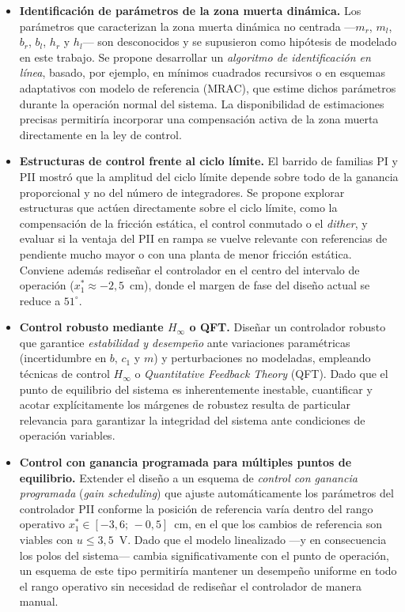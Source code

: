 \begin{itemize}
    \item \textbf{Identificación de parámetros de la zona muerta dinámica.}
    Los parámetros que caracterizan la zona muerta dinámica no centrada ---$m_r$, $m_l$,
    $b_r$, $b_l$, $h_r$ y $h_l$--- son desconocidos y se supusieron como hipótesis de
    modelado en este trabajo. Se propone desarrollar un \emph{algoritmo de identificación
    en línea}, basado, por ejemplo, en mínimos cuadrados recursivos o en esquemas
    adaptativos con modelo de referencia (MRAC), que estime dichos parámetros durante la operación normal del
    sistema. La disponibilidad de estimaciones precisas permitiría incorporar una
    compensación activa de la zona muerta directamente en la ley de control.

    \item \textbf{Estructuras de control frente al ciclo límite.}
    El barrido de familias PI y PII mostró que la amplitud del ciclo límite depende sobre todo
    de la ganancia proporcional y no del número de integradores. Se propone explorar
    estructuras que actúen directamente sobre el ciclo límite, como la compensación de la
    fricción estática, el control conmutado o el \textit{dither}, y evaluar si la ventaja del PII
    en rampa se vuelve relevante con referencias de pendiente mucho mayor o con una planta de
    menor fricción estática. Conviene además rediseñar el controlador en el centro del
    intervalo de operación ($x_1^*\approx-2{,}5$~cm), donde el margen de fase del diseño actual
    se reduce a $51^\circ$.

    \item \textbf{Control robusto mediante $H_\infty$ o QFT.}
    Diseñar un controlador robusto que garantice \emph{estabilidad y desempeño} ante
    variaciones paramétricas (incertidumbre en $b$, $c_1$ y $m$) y perturbaciones no
    modeladas, empleando técnicas de control $H_\infty$ o \textit{Quantitative Feedback
    Theory} (QFT). Dado que el punto de equilibrio del sistema es inherentemente inestable,
    cuantificar y acotar explícitamente los márgenes de robustez resulta de particular
    relevancia para garantizar la integridad del sistema ante condiciones de operación
    variables.

    \item \textbf{Control con ganancia programada para múltiples puntos de equilibrio.}
    Extender el diseño a un esquema de \emph{control con ganancia programada}
    (\textit{gain scheduling}) que ajuste automáticamente los parámetros del controlador
    PII conforme la posición de referencia varía dentro del rango operativo
    $x_1^* \in [-3{,}6;\,-0{,}5]$~cm, en el que los cambios de referencia son viables con $u\le 3{,}5$~V. Dado que el modelo linealizado ---y en consecuencia
    los polos del sistema--- cambia significativamente con el punto de operación, un
    esquema de este tipo permitiría mantener un desempeño uniforme en todo el rango operativo
    sin necesidad de rediseñar el controlador de manera manual.


\end{itemize}
